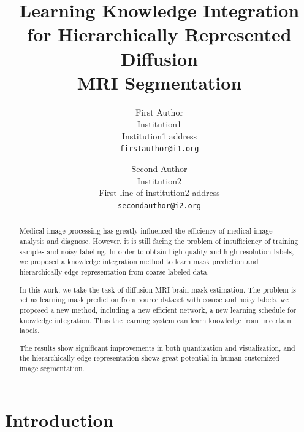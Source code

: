 \documentclass[10pt,twocolumn,letterpaper]{article}
\begin{document}
\title{Learning Knowledge Integration for Hierarchically Represented Diffusion \\ MRI Segmentation}

\author{First Author\\
Institution1\\
Institution1 address\\
{\tt\small firstauthor@i1.org}
\and
Second Author\\
Institution2\\
First line of institution2 address\\
{\tt\small secondauthor@i2.org}
}
\maketitle

\begin{abstract}
Medical image processing has greatly influenced the efficiency of medical image analysis and diagnose. 
However, it is still facing the problem of insufficiency of training samples and noisy labeling. 
In order to obtain high quality and high resolution labels, we proposed a knowledge integration method to learn mask prediction and hierarchically edge representation from coarse labeled data. 

In this work, we take the task of diffusion MRI brain mask estimation. 
The problem is set as learning mask prediction from source dataset with coarse and noisy labels. 
we proposed a new method, including a new efficient network, 
a new learning schedule for knowledge integration. 
Thus the learning system can learn knowledge from uncertain labels.

The results show significant improvements in both quantization and visualization, and the hierarchically edge representation shows great potential in human customized image segmentation.

\end{abstract}

\section{Introduction}
\label{sec:intro}
\end{document}
